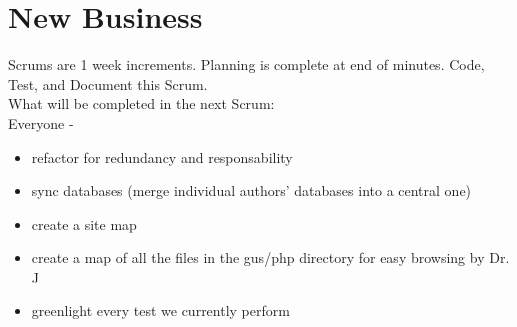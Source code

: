 \documentclass[12pt]{article}
\begin{document}
\section{New Business}
Scrums are 1 week increments. Planning is complete at end of minutes. Code, Test, and Document this Scrum.\\
What will be completed in the next Scrum:\\
Everyone - \\
\begin{itemize}
	\item refactor for redundancy and responsability
	\item sync databases (merge individual authors' databases into a central one)
	\item create a site map
	\item create a map of all the files in the gus/php directory for easy browsing by Dr. J
	\item greenlight every test we currently perform
\end{itemize}
\end{document}
